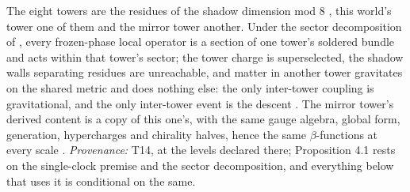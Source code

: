 The eight towers are the residues of the shadow dimension mod $8$ \cite[Prop.~3.1]{ButlerT14}, this world's tower one of them and the mirror tower another. Under the sector decomposition of \cite[Def.~3.6]{ButlerT14}, every frozen-phase local operator is a section of one tower's soldered bundle and acts within that tower's sector; the tower charge is superselected, the shadow walls separating residues are unreachable, and matter in another tower gravitates on the shared metric and does nothing else: the only inter-tower coupling is gravitational, and the only inter-tower event is the descent \cite[Prop.~4.1]{ButlerT14}. The mirror tower's derived content is a copy of this one's, with the same gauge algebra, global form, generation, hypercharges and chirality halves, hence the same $\beta$-functions at every scale \cite[Thm.~4.3(i),(iii)]{ButlerT14}. \emph{Provenance:} T14, at the levels declared there; Proposition 4.1 rests on the single-clock premise and the sector decomposition, and everything below that uses it is conditional on the same.
